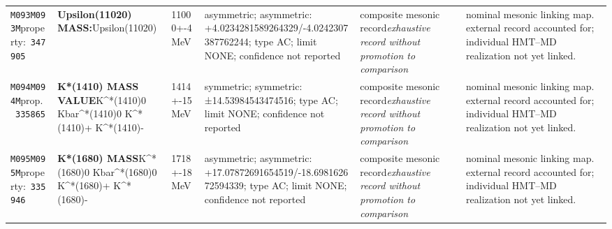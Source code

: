 \begin{landscape}
\begin{longtable}{L{1.85cm}L{4.45cm}L{2.35cm}L{4.05cm}L{3.35cm}L{7.15cm}}
\texttt{M093}\newline \texttt{M093M}\newline property:\ \texttt{347905} & \textbf{Upsilon(11020) MASS:}\newline Upsilon(11020) & 11000+-4\,MeV & asymmetric; asymmetric: +4.0234281589264329/-4.0242307387762244; type AC; limit NONE; confidence not reported & composite mesonic record\newline \emph{exhaustive record without promotion to comparison} & nominal mesonic linking map. external record accounted for; individual HMT--MD realization not yet linked. \\
\texttt{M094}\newline \texttt{M094M}\newline prop.\ \texttt{335865} & \textbf{K*(1410) MASS VALUE}\newline K\textasciicircum{}*(1410)0 \textbar{}\allowbreak{} Kbar\textasciicircum{}*(1410)0 \textbar{}\allowbreak{} K\textasciicircum{}*(1410)+ \textbar{}\allowbreak{} K\textasciicircum{}*(1410)- & 1414+-15\,MeV & symmetric; symmetric: ±14.53984543474516; type AC; limit NONE; confidence not reported & composite mesonic record\newline \emph{exhaustive record without promotion to comparison} & nominal mesonic linking map. external record accounted for; individual HMT--MD realization not yet linked. \\
\texttt{M095}\newline \texttt{M095M}\newline property:\ \texttt{335946} & \textbf{K*(1680) MASS}\newline K\textasciicircum{}*(1680)0 \textbar{}\allowbreak{} Kbar\textasciicircum{}*(1680)0 \textbar{}\allowbreak{} K\textasciicircum{}*(1680)+ \textbar{}\allowbreak{} K\textasciicircum{}*(1680)- & 1718+-18\,MeV & asymmetric; asymmetric: +17.07872691654519/-18.698162672594339; type AC; limit NONE; confidence not reported & composite mesonic record\newline \emph{exhaustive record without promotion to comparison} & nominal mesonic linking map. external record accounted for; individual HMT--MD realization not yet linked. \\

\end{longtable}
\end{landscape}

